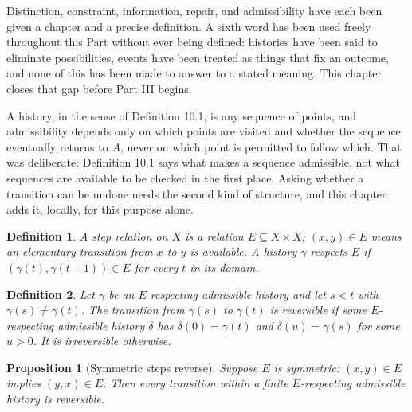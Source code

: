 \documentclass[11pt]{book}
\newtheorem*{appendixdefinition}{Definition}
\newtheorem*{appendixproposition}{Proposition}
\begin{document}
Distinction, constraint, information, repair, and admissibility have each been given a chapter and a precise definition. A sixth word has been used freely throughout this Part without ever being defined: histories have been said to eliminate possibilities, events have been treated as things that fix an outcome, and none of this has been made to answer to a stated meaning. This chapter closes that gap before Part III begins.

A history, in the sense of Definition 10.1, is any sequence of points, and admissibility depends only on which points are visited and whether the sequence eventually returns to $A$, never on which point is permitted to follow which. That was deliberate: Definition 10.1 says what makes a sequence admissible, not what sequences are available to be checked in the first place. Asking whether a transition can be undone needs the second kind of structure, and this chapter adds it, locally, for this purpose alone.

\begin{appendixdefinition}
A \emph{step relation} on $X$ is a relation $E \subseteq X \times X$; $(x,y) \in E$ means an elementary transition from $x$ to $y$ is available. A history $\gamma$ \emph{respects} $E$ if $(\gamma(t), \gamma(t+1)) \in E$ for every $t$ in its domain.
\end{appendixdefinition}

\begin{appendixdefinition}
Let $\gamma$ be an $E$-respecting admissible history and let $s < t$ with $\gamma(s) \neq \gamma(t)$. The transition from $\gamma(s)$ to $\gamma(t)$ is \emph{reversible} if some $E$-respecting admissible history $\delta$ has $\delta(0) = \gamma(t)$ and $\delta(u) = \gamma(s)$ for some $u > 0$. It is \emph{irreversible} otherwise.
\end{appendixdefinition}

\begin{appendixproposition}[Symmetric steps reverse]
Suppose $E$ is symmetric: $(x,y) \in E$ implies $(y,x) \in E$. Then every transition within a finite $E$-respecting admissible history is reversible.
\end{appendixproposition}
\end{document}

